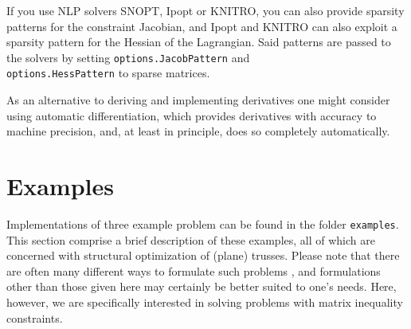 \documentclass{article}
\begin{document}
If you use NLP solvers SNOPT, Ipopt or KNITRO, you can also provide sparsity patterns for the constraint Jacobian, and Ipopt
and KNITRO can also exploit a sparsity pattern for the Hessian of the Lagrangian. Said patterns are passed to the solvers
by setting \texttt{options.JacobPattern} and \\\texttt{options.HessPattern} to sparse matrices.

As an alternative to deriving and implementing derivatives one might consider using automatic differentiation, which provides 
derivatives with accuracy to machine precision, and, at least in principle, does so completely automatically.

			   


\section{Examples}

Implementations of three example problem can be found in the folder \texttt{examples}. This section comprise a brief description of these examples, all of which are concerned with structural optimization of (plane) trusses. Please note that there are often many different ways to formulate such problems \cite{Cristensen:2009,Bendsoe:1994}, and formulations other than those given here may certainly be better suited to one's needs. Here, however, we are specifically interested in solving problems with matrix inequality constraints. 
\end{document}
